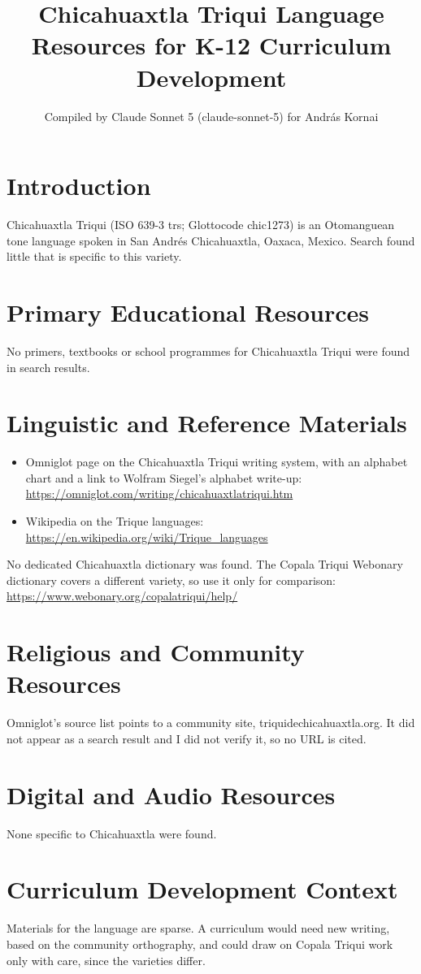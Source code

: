 \documentclass[12pt]{article}
\title{Chicahuaxtla Triqui Language Resources for K-12 Curriculum Development}
\author{Compiled by Claude Sonnet 5 (claude-sonnet-5) for Andr\'as Kornai}
\date{}
\begin{document}
\maketitle

\section{Introduction}
Chicahuaxtla Triqui (ISO 639-3 trs; Glottocode chic1273) is an Otomanguean tone language spoken in San Andr\'es Chicahuaxtla, Oaxaca, Mexico. Search found little that is specific to this variety.

\section{Primary Educational Resources}
No primers, textbooks or school programmes for Chicahuaxtla Triqui were found in search results.

\section{Linguistic and Reference Materials}
\begin{itemize}
\item Omniglot page on the Chicahuaxtla Triqui writing system, with an alphabet chart and a link to Wolfram Siegel's alphabet write-up: \url{https://omniglot.com/writing/chicahuaxtlatriqui.htm}
\item Wikipedia on the Trique languages: \url{https://en.wikipedia.org/wiki/Trique_languages}
\end{itemize}
No dedicated Chicahuaxtla dictionary was found. The Copala Triqui Webonary dictionary covers a different variety, so use it only for comparison: \url{https://www.webonary.org/copalatriqui/help/}

\section{Religious and Community Resources}
Omniglot's source list points to a community site, triquidechicahuaxtla.org. It did not appear as a search result and I did not verify it, so no URL is cited.

\section{Digital and Audio Resources}
None specific to Chicahuaxtla were found.

\section{Curriculum Development Context}
Materials for the language are sparse. A curriculum would need new writing, based on the community orthography, and could draw on Copala Triqui work only with care, since the varieties differ.
\end{document}
